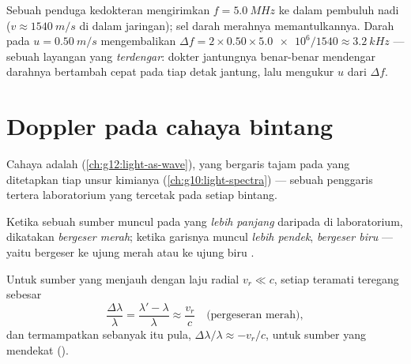 \begin{example}\label{ex:g12:doppler-effect:ultrasound}
Sebuah penduga kedokteran mengirimkan  $f = \qty{5.0}{MHz}$ ke dalam pembuluh
nadi ($v \approx \qty{1540}{m/s}$ di dalam jaringan); sel darah merahnya memantulkannya.
Darah pada $u = \qty{0.50}{m/s}$ mengembalikan
$\Delta f = 2 \times 0.50 \times \num{5.0e6}/1540 \approx
\qty{3.2}{kHz}$ --- sebuah
layangan yang \emph{terdengar}: dokter jantungnya benar-benar mendengar darahnya
bertambah cepat pada tiap detak jantung, lalu mengukur $u$ dari $\Delta f$.
\end{example}

\section{Doppler pada cahaya bintang}

Cahaya adalah  (\cref{ch:g12:light-as-wave}), yang  bergaris tajam pada
 yang ditetapkan tiap unsur kimianya (\cref{ch:g10:light-spectra}) ---
sebuah penggaris tertera laboratorium yang tercetak pada setiap bintang.

\begin{definition}\label{def:g12:doppler-effect:redshift}
Ketika  sebuah sumber muncul pada  yang \emph{lebih panjang}
daripada di laboratorium,  dikatakan \emph{bergeser
merah}; ketika garisnya muncul \emph{lebih pendek}, 
\emph{bergeser biru} --- yaitu bergeser ke ujung merah atau ke ujung
biru .
\end{definition}

\begin{proposition}\label{prop:g12:doppler-effect:light}
Untuk sumber yang menjauh dengan laju radial $v_r \ll c$, setiap 
teramati teregang sebesar
\[ \frac{\Delta \lambda}{\lambda} = \frac{\lambda' - \lambda}{\lambda} \approx \frac{v_r}{c} \quad \text{(pergeseran merah)}, \]
dan termampatkan sebanyak itu pula, $\Delta\lambda/\lambda \approx -v_r/c$, untuk sumber
yang mendekat ().
\end{proposition}
\admitted

